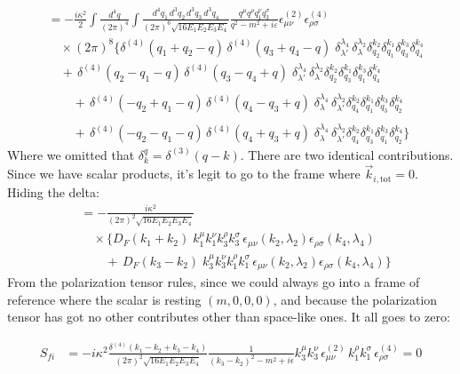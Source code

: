\documentclass[12pt,a4paper]{article}
\begin{document}
\begin{align*}
&= -\frac{i\kappa^2}{2}\int \frac{d^4q}{(2\pi)^4}
\int \frac{d^4q_1\,d^3q_2\, d^3q_3\, d^3q_4}{(2\pi)^6 \sqrt{16 E_1E_2E_3 E_4}}
\frac{q^{\mu}q^{\rho}q_1^{\nu}{q}^\sigma_{3}}{q^2 - m^2 +i\varepsilon}
\epsilon_{\mu\nu}^{(2)}\epsilon_{\rho\sigma}^{(4)}
\nonumber\\
&\quad \times (2\pi)^8
\Biggl\{
\delta^{(4)}(q_1+q_2-q)\,\delta^{(4)}(q_3+q_4-q)\;
\delta^{\lambda_4}_{\lambda'} \, \delta^{\lambda_2}_{\lambda} \delta^{k_2}_{q_2}\delta^{k_1}_{q_1}\delta^{k_3}_{q_3}\delta^{k_4}_{q_4} \\
&\quad
+\,\delta^{(4)}(q_2-q_1-q)\,\delta^{(4)}(q_3-q_4+q)\;
\delta^{\lambda_4}_{\lambda'} \, \delta^{\lambda_2}_{\lambda} \delta^{k_2}_{q_2}\delta^{k_1}_{q_3}\delta^{k_3}_{q_1}\delta^{k_4}_{q_4} \\ \\
&\qquad
+\,\delta^{(4)}(-q_2+q_1-q)\,\delta^{(4)}(q_4-q_3+q)\;
\delta^{\lambda_4}_{\lambda} \, \delta^{\lambda_2}_{\lambda'} \delta^{k_2}_{q_4}\delta^{k_1}_{q_1}\delta^{k_3}_{q_3}\delta^{k_4}_{q_2} \\\\
&\qquad
+\,\delta^{(4)}(-q_2-q_1-q)\,\delta^{(4)}(q_4+q_3+q)\;
\delta^{\lambda_4}_{\lambda} \, \delta^{\lambda_2}_{\lambda'} \delta^{k_2}_{q_4}\delta^{k_1}_{q_3}\delta^{k_3}_{q_1}\delta^{k_4}_{q_2}
\Biggr\}
\end{align*}
Where we omitted that $\delta^q_k=\delta^{(3)}(q-k)$. There are two identical contributions. Since we have scalar products, it's legit to go to the frame where $\vec{k}_{i,\mathrm{tot}}=0$. Hiding the delta:
\begin{align*}
&= -\frac{i\kappa^2}{(2\pi)^2\sqrt{16E_1 E_2 E_3 E_4}}
\\
&\quad \times
\Biggl\{
D_F(k_1+k_2)\;k_1^\mu k_1^\nu
k_3^\rho k_3^\sigma\,
\epsilon_{\mu\nu}(k_2,\lambda_2)\epsilon_{\rho\sigma}(k_4,\lambda_4)
\nonumber\\
&\qquad
+\,D_F(k_3-k_2)\;k_3^\mu k_3^\nu
k_1^\rho k_1^\sigma\,
\epsilon_{\mu\nu}(k_2,\lambda_2)\epsilon_{\rho\sigma}(k_4,\lambda_4)
\nonumber\Biggr\}
\end{align*}
From the polarization tensor rules, since we could always go into a frame of reference where the scalar is resting $(m,0,0,0)$, and because the polarization tensor has got no other contributes other than space-like ones. It all goes to zero:

\begin{align}
S_{fi}
&= -i \kappa^2
\frac{\delta^{(4)}(k_1-k_2+k_3-k_4)}{(2\pi)^2 \sqrt{16 E_1 E_2 E_3 E_4}}
\frac{1}{(k_3 - k_2)^2 - m^2 + i\epsilon}
\nonumber
k_3^\mu k_3^\nu\,
\epsilon_{\mu\nu}^{(2)}
\,k_1^\rho k_1^\sigma\,
\epsilon_{\rho\sigma}^{(4)}=0
\end{align}
\end{document}
